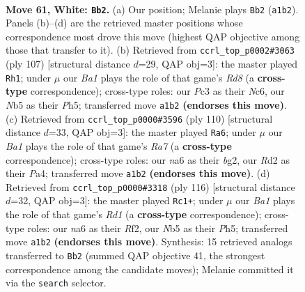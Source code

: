 \documentclass[11pt]{article}
\begin{document}
\clearpage

\begin{figure}[p]\centering
\begin{subfigure}{0.46\textwidth}\centering
\resizebox{\linewidth}{!}{%
\newchessgame
\chessboard[
  setfen={8/4p2k/npr5/pN4p1/P1p5/2P3K1/3R4/B7 w - - 2 61},
  showmover=false,
  pgfstyle=straightmove, color=movearrow, markmove={a1-b2}
]}
\caption{}
\end{subfigure}\hfill
\begin{subfigure}{0.46\textwidth}\centering
\resizebox{\linewidth}{!}{%
\newchessgame
\chessboard[
  setfen={8/6k1/2n3p1/6Pp/2N1R2P/1p6/1P3K2/3r4 b - - 10 54},
  showmover=false,
  pgfstyle=straightmove, color=movearrow, markmove={d1-h1}
]}
\caption{}
\end{subfigure}
\\[4pt]
\begin{subfigure}{0.46\textwidth}\centering
\resizebox{\linewidth}{!}{%
\newchessgame
\chessboard[
  setfen={6k1/R7/1p3r1p/4N1p1/P2P1p2/7P/4KPb1/8 w - - 4 56},
  showmover=false,
  pgfstyle=straightmove, color=movearrow, markmove={a7-a6}
]}
\caption{}
\end{subfigure}\hfill
\begin{subfigure}{0.46\textwidth}\centering
\resizebox{\linewidth}{!}{%
\newchessgame
\chessboard[
  setfen={8/r3n1p1/4P2p/4K2P/p1k3P1/1p6/5R2/3R4 w - - 5 59},
  showmover=false,
  pgfstyle=straightmove, color=movearrow, markmove={d1-c1}
]}
\caption{}
\end{subfigure}
\caption{\textbf{Move 61, White: \texttt{Bb2}.} (a) Our position; Melanie plays \texttt{Bb2} (\texttt{a1b2}). Panels (b)--(d) are the retrieved master positions whose correspondence most drove this move (highest QAP objective among those that transfer to it). (b) Retrieved from \texttt{ccrl\_top\_p0002\#3063} (ply 107) [structural distance $d$=29, QAP obj=3]: the master played \texttt{Rh1}; under $\mu$ our \emph{Ba1} plays the role of that game's \emph{Rd8} (a \textbf{cross-type} correspondence); cross-type roles: our \emph{P}c3 as their \emph{N}c6, our \emph{N}b5 as their \emph{P}h5; transferred move \texttt{a1b2} \textbf{(endorses this move)}. (c) Retrieved from \texttt{ccrl\_top\_p0000\#3596} (ply 110) [structural distance $d$=33, QAP obj=3]: the master played \texttt{Ra6}; under $\mu$ our \emph{Ba1} plays the role of that game's \emph{Ra7} (a \textbf{cross-type} correspondence); cross-type roles: our \emph{n}a6 as their \emph{b}g2, our \emph{R}d2 as their \emph{P}a4; transferred move \texttt{a1b2} \textbf{(endorses this move)}. (d) Retrieved from \texttt{ccrl\_top\_p0000\#3318} (ply 116) [structural distance $d$=32, QAP obj=3]: the master played \texttt{Rc1+}; under $\mu$ our \emph{Ba1} plays the role of that game's \emph{Rd1} (a \textbf{cross-type} correspondence); cross-type roles: our \emph{n}a6 as their \emph{R}f2, our \emph{N}b5 as their \emph{P}h5; transferred move \texttt{a1b2} \textbf{(endorses this move)}. Synthesis: 15 retrieved analogs transferred to \texttt{Bb2} (summed QAP objective 41, the strongest correspondence among the candidate moves); Melanie committed it via the \texttt{search} selector.}
\label{fig:thought-m120}
\end{figure}
\end{document}

